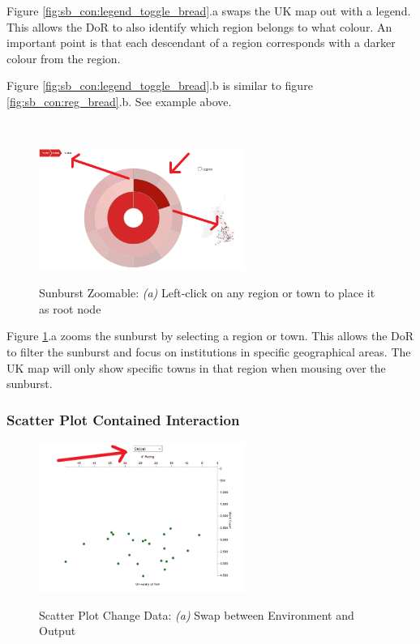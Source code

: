 \documentclass[a4paper, 11pt]{article}
\begin{document}
\noindent Figure \ref{fig:sb_con:legend_toggle_bread}.a swaps the UK map out with a legend. This allows the DoR to also identify which region belongs to what colour. An important point is that each descendant of a region corresponds with a darker colour from the region.

\noindent Figure \ref{fig:sb_con:legend_toggle_bread}.b is similar to figure \ref{fig:sb_con:reg_bread}.b. See example above.


\\

\begin{figure}[hbt!]
	\centering
      \includegraphics[width=0.6\textwidth]{imgs/sb_int/zoomable_sb.png} \\
	\caption{Sunburst Zoomable: 
	\textit{(a)} Left-click on any region or town to place it as root node}
    \label{fig:sb_con:zoomable_sb}
     \noindent\makebox[\linewidth]{\rule{\textwidth}{0.4pt}}
\end{figure}

\noindent Figure \ref{fig:sb_con:zoomable_sb}.a zooms the sunburst by selecting a region or town. This allows the DoR to filter the sunburst and focus on institutions in specific geographical areas. The UK map will only show specific towns in that region when mousing over the sunburst.

\newpage
\subsubsection{Scatter Plot Contained Interaction}
\begin{figure}[hbt!]
	\centering
      \includegraphics[width=0.6\textwidth]{imgs/sp_int/change_data.png} \\
	\caption{Scatter Plot Change Data: 
	\textit{(a)} Swap between Environment and Output}
    \label{fig:sp_con:swap_data}
     \noindent\makebox[\linewidth]{\rule{\textwidth}{0.4pt}}
\end{figure}
\end{document}
